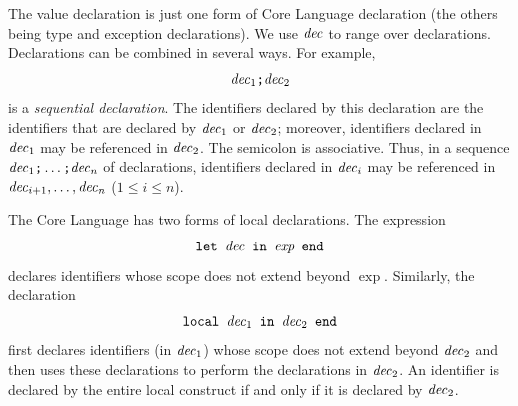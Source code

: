\documentclass[12pt]{book}
\begin{document}
The value declaration is just one form of Core Language declaration
(the others being type and exception declarations). We use ${\it dec}$ to
range over declarations. Declarations can be
combined in several ways. For example,
%
$${\it dec}_1\hbox{\tt ;}{\it dec}_2$$
is a {\em sequential declaration}. The
identifiers declared by this declaration are the identifiers that are
declared by ${\it dec}_1$ or ${\it dec}_2$; moreover, identifiers declared in
${\it dec}_1$ may be referenced in ${\it dec}_2$. The
%
semicolon is associative. Thus, in a sequence
${\it dec}_1\hbox{\tt ;}\ldots\hbox{\tt ;}{\it dec}_n$ of declarations, identifiers
declared in ${\it dec}_i$ may be referenced in ${\it dec}_{i+1},\ldots ,{\it dec}_n$
($1\leq i\leq n$).

The Core Language has two forms of
%
%
local declarations. The expression
$$\hbox{\tt let ${\it dec}$ in $\hbox{\it exp}$ end}$$
declares identifiers whose scope
does not extend beyond $\exp$. Similarly, the declaration
%
$$\hbox{\tt local ${\it dec}_1$ in ${\it dec}_2$ end}$$
first declares identifiers
(in ${\it dec}_1$) whose scope does not extend beyond ${\it dec}_2$ and then
uses these declarations to perform the declarations in ${\it dec}_2$. An
identifier is declared by the entire local construct if and only if it
is declared by ${\it dec}_2$.

\end{document}

